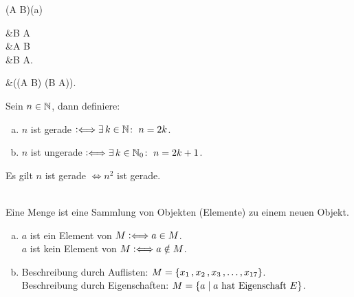 \documentclass[../ana1.tex]{subfiles}
\begin{document}
\begin{bem}\leavevmode
	\begin{alignenum}{(A \Leftrightarrow B)}{(a)}
		\begin{aitem}
			 &\Leftrightarrow B  A\\
										  &\Leftrightarrow A  B\\
										  &\Leftrightarrow \neg B \Rightarrow \neg A.
		\end{aitem}\begin{aitem}
			 &\Leftrightarrow ((A \Rightarrow B) \wedge (B \Rightarrow A)).
		\end{aitem}
	\end{alignenum}
\end{bem}

\begin{defi*}
	Sein \(n \in \mathbb{N} \), dann definiere:
	\begin{enumerate}[(a)]
		\item \(n \) ist gerade \(\mathrel{\vcentcolon\Longleftrightarrow} \exists \, k \in \mathbb{N} \colon \; n = 2k \).
		\item \(n \) ist ungerade \(\mathrel{\vcentcolon\Longleftrightarrow} \exists \, k \in \mathbb{N}_{0} \colon \; n = 2k + 1 \).
	\end{enumerate}
\end{defi*}

\begin{bsp}
	Es gilt \(n \) ist gerade \(\iff n^2 \) ist gerade.
	\begin{bew}
	\end{bew}
\end{bsp}

\begin{defi*}\leavevmode \\
	Eine Menge ist eine Sammlung von Objekten (Elemente) zu einem neuen Objekt.
\end{defi*}

\begin{notation}\leavevmode
	\begin{enumerate}[(a)]
		\item \(a \) ist ein Element von \(M \mathrel{\vcentcolon\Longleftrightarrow} a \in M \).\\
			  \(a \) ist kein Element von \(M \mathrel{\vcentcolon\Longleftrightarrow} a \notin M \).
		\item Beschreibung durch Auflisten: \(M = \{x_{1} \operatorname{,} x_{2} \operatorname{,} x_{3} \operatorname{,} \ldots \operatorname{,} x_{17}\} \).\\
			  Beschreibung durch Eigenschaften: \(M = \{a \; \vert \; a \text{ hat Eigenschaft } E\} \).
	\end{enumerate}
\end{notation}
\end{document}
